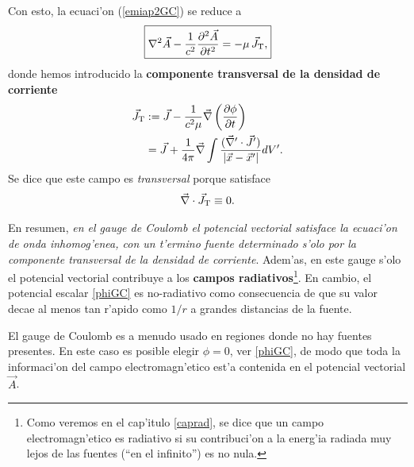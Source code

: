 Con esto, la ecuaci'on (\ref{emiap2GC}) se reduce a
\begin{equation}\label{emiap3GC}
\boxed{\nabla^2\vec{A}-\frac{1}{c^2}\frac{\partial^2\vec{A}}{\partial t^2}=-\mu\,\vec{J}_{\rm T},}
\end{equation}
donde hemos introducido la \textbf{componente transversal de la densidad de corriente}
\begin{align}
\vec{J}_{\rm T} &:= \vec{J}-\frac{1}{c^2\mu}\vec{\nabla}\left(\frac{\partial\phi }{\partial t}\right) \\
&= \vec{J}+\frac{1}{4\pi} \vec{\nabla}\int\frac{(\vec{\nabla}'\cdot\vec{J}')}{\left|\vec{x}-\vec{x}'\right|}dV'.
\end{align}
Se dice que este campo es \textit{transversal} porque satisface
\begin{equation}
\vec\nabla\cdot\vec{J}_{\rm T}\equiv 0.
\end{equation}

En resumen, \textit{en el gauge de Coulomb el potencial vectorial satisface la  \textit{ecuaci'on de onda inhomog'enea}, con un t'ermino fuente determinado s'olo por la componente transversal de la densidad de corriente}. Adem'as, en este gauge  s'olo el potencial vectorial contribuye a los \textbf{campos radiativos}\footnote{Como veremos en el cap'itulo \ref{caprad}, se dice que un campo electromagn'etico es radiativo si su contribuci'on a la energ'ia radiada muy lejos de las fuentes (``en el infinito'') es no nula.}. En cambio, el potencial escalar \eqref{phiGC} es no-radiativo como consecuencia de que su valor decae al menos tan r'apido como $1/r$ a grandes distancias de la fuente.

El gauge de Coulomb es a menudo usado en regiones donde no hay fuentes presentes. En este caso es posible elegir $\phi=0$, ver \eqref{phiGC}, de modo que toda la informaci'on del campo electromagn'etico est'a contenida en el potencial vectorial $\vec{A}$.


